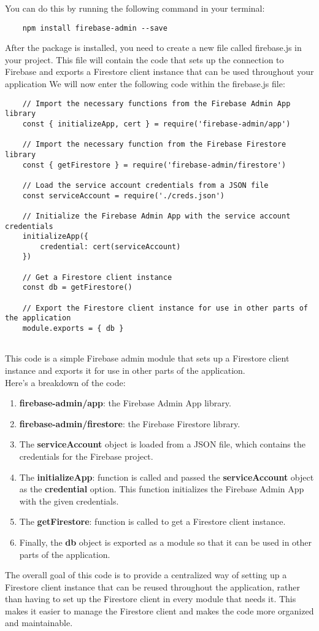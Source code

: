 \documentclass{article}
\begin{document}
You can do this by running the following command in your terminal:
\begin{verbatim}
    npm install firebase-admin --save
  \end{verbatim}
After the package is installed, you need to create a new file called firebase.js in your project. This file will contain the code that sets up the connection to Firebase and exports a Firestore client instance that can be used throughout your application
We will now enter the following code within the firebase.js file:

\begin{verbatim}
    // Import the necessary functions from the Firebase Admin App library
    const { initializeApp, cert } = require('firebase-admin/app') 
    
    // Import the necessary function from the Firebase Firestore library
    const { getFirestore } = require('firebase-admin/firestore') 
    
    // Load the service account credentials from a JSON file
    const serviceAccount = require('./creds.json') 
    
    // Initialize the Firebase Admin App with the service account credentials
    initializeApp({
        credential: cert(serviceAccount) 
    })
    
    // Get a Firestore client instance
    const db = getFirestore() 
    
    // Export the Firestore client instance for use in other parts of the application
    module.exports = { db }
    
\end{verbatim}
This code is a simple Firebase admin module that sets up a Firestore client instance and exports it for use in other parts of the application.\\
Here's a breakdown of the code:

\begin{enumerate}
    \item \textbf{firebase-admin/app}: the Firebase Admin App library.
    \item \textbf{firebase-admin/firestore}:  the Firebase Firestore library.
    \item The \textbf{serviceAccount} object is loaded from a JSON file, which contains the credentials for the Firebase project.
    \item The \textbf{initializeApp}: function is called and passed the \textbf{serviceAccount} object as the \textbf{credential} option. This function initializes the Firebase Admin App with the given credentials.
    \item The \textbf{getFirestore}: function is called to get a Firestore client instance.
    \item Finally, the \textbf{db} object is exported as a module so that it can be used in other parts of the application.
\end{enumerate}

The overall goal of this code is to provide a centralized way of setting up a Firestore client instance that can be reused throughout the application, rather than having to set up the Firestore client in every module that needs it.
 This makes it easier to manage the Firestore client and makes the code more organized and maintainable.
\end{document}
